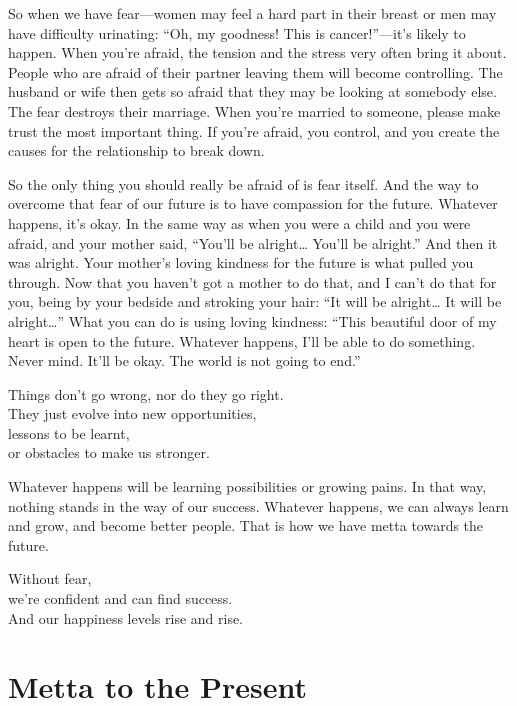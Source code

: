 \documentclass[12pt, openany]{book}
\newenvironment{aphorism}%
{%
\begin{center}\begin{itshape}
}%
{\end{itshape}\end{center}
}%
\newcommand{\fleuron}{%
\begin{center}
\vspace{2em}
\fallbackfont{❦}
\end{center}
}
\begin{document}
So when we have fear—women may feel a hard part in their breast or men may have difficulty urinating: “Oh, my goodness! This is cancer!”—it’s likely to happen. When you’re afraid, the tension and the stress very often bring it about. People who are afraid of their partner leaving them will become controlling. The husband or wife then gets so afraid that they may be looking at somebody else. The fear destroys their marriage. When you’re married to someone, please make trust the most important thing. If you’re afraid, you control, and you create the causes for the relationship to break down. 

So the only thing you should really be afraid of is fear itself. And the way to overcome that fear of our future is to have compassion for the future. Whatever happens, it’s okay. In the same way as when you were a child and you were afraid, and your mother said, “You’ll be alright… You’ll be alright.” And then it was alright. Your mother’s loving kindness for the future is what pulled you through. Now that you haven’t got a mother to do that, and I can’t do that for you, being by your bedside and stroking your hair: “It will be alright… It will be alright…” What you can do is using loving kindness: “This beautiful door of my heart is open to the future. Whatever happens, I’ll be able to do something. Never mind. It’ll be okay. The world is not going to end.” 

\newpage

\begin{aphorism}
Things don’t go wrong, nor do they go right.\\  
They just evolve into new opportunities,\\ 
lessons to be learnt,\\  
or obstacles to make us stronger.
\end{aphorism}

Whatever happens will be learning possibilities or growing pains. In that way, nothing stands in the way of our success. Whatever happens, we can always learn and grow, and become better people. That is how we have metta towards the future. 

\begin{aphorism}
Without fear,\\  
we’re confident and can find success.\\ 
And our happiness levels rise and rise.
\end{aphorism}

\fleuron

\chapter{Metta to the Present} 
\end{document}
